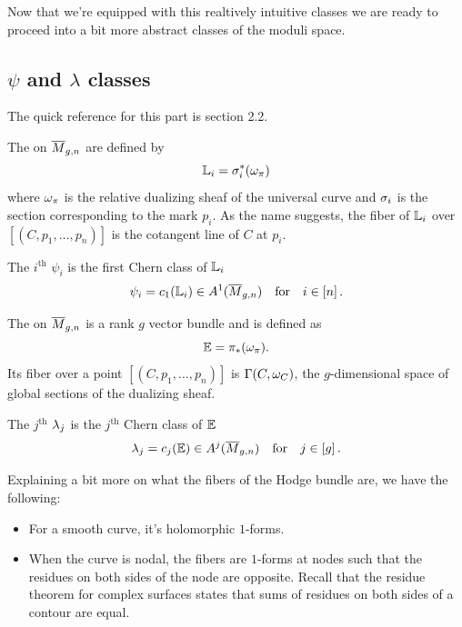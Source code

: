 \documentclass[12pt]{memoir}
\begin{document}
Now that we're equipped with this realtively intuitive classes we are ready to proceed into a bit more abstract classes of the moduli space.

\subsection{$\psi$ and $\lambda$ classes}

The quick reference for this part is \cite{cavalieri2022pseudostablehodgeintegrals} section 2.2. 

\begin{Def}
    The  on $\overline M_{g,n}$ are defined by 
    $$\mathbb{L}_i=\sigma_i^\ast(\omega_\pi)$$
    where $\omega_\pi$ is the relative dualizing sheaf of the universal curve and $\sigma_i$ is the section corresponding to the mark $p_i$. As the name suggests, the fiber of $\mathbb{L}_i$ over $[(C,p_1,\dots,p_n)]$ is the cotangent line of $C$ at $p_i$.\par
    The $i^{\text{th}}$  $\psi_i$ is the first Chern class of $\mathbb{L}_i$
    $$\psi_i=c_1(\mathbb{L}_i)\in A^1(\overline M_{g,n})\quad\text{for}\quad i\in\left\lbrack n\right\rbrack.$$
\end{Def}

\begin{Def}
    The  on $\overline M_{g,n}$ is a rank $g$ vector bundle and is defined as 
    $$\mathbb{E}=\pi_\ast(\omega_\pi).$$
    Its fiber over a point $[(C,p_1,\dots,p_n)]$ is $\Gamma(C,\omega_C)$, the $g$-dimensional space of global sections of the dualizing sheaf.\par
    The $j^{\text{th}}$  $\lambda_j$ is the $j^{\text{th}}$ Chern class of $\mathbb{E}$
    $$\lambda_j=c_j(\mathbb{E})\in A^j(\overline M_{g,n})\quad\text{for}\quad j\in\left\lbrack g\right\rbrack.$$
\end{Def}

\begin{Rmk}
    Explaining a bit more on what the fibers of the Hodge bundle are, we have the following:
    \begin{itemize}
        \item For a smooth curve, it's holomorphic $1$-forms.
        \item When the curve is nodal, the fibers are $1$-forms at nodes such that the residues on both sides of the node are opposite. Recall that the residue theorem for complex surfaces states that sums of residues on both sides of a contour are equal.
    \end{itemize}
\end{Rmk}
\end{document}
